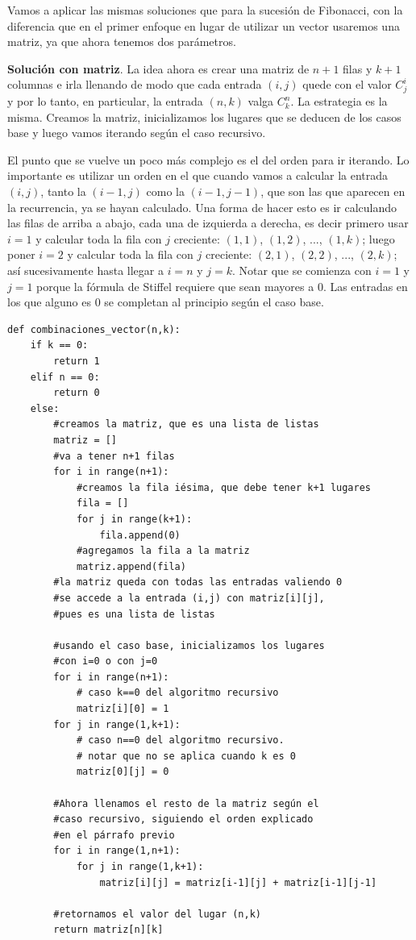 \documentclass[a4paper, 12pt]{report}
\theoremstyle{definition}
\begin{document}
Vamos a aplicar las mismas soluciones que para la sucesión de Fibonacci, con la diferencia que en el primer enfoque en lugar de utilizar un vector usaremos una matriz, ya que ahora tenemos dos parámetros.

{\bf Solución con matriz}. La idea ahora es crear una matriz de $n+1$ filas y $k+1$ columnas e irla llenando de modo que cada entrada $(i,j)$ quede con el valor $C^i_j$ y por lo tanto, en particular, la entrada $(n,k)$ valga $C^n_k$. La estrategia es la misma. Creamos la matriz, inicializamos los lugares que se deducen de los casos base y luego vamos iterando según el caso recursivo.

El punto que se vuelve un poco más complejo es el del orden para ir iterando. Lo importante es utilizar un orden en el que cuando vamos a calcular la entrada $(i,j)$, tanto la $(i-1,j)$ como la $(i-1,j-1)$, que son las que aparecen en la recurrencia, ya se hayan calculado. Una forma de hacer esto es ir calculando las filas de arriba a abajo, cada una de izquierda a derecha, es decir primero usar $i=1$ y calcular toda la fila con $j$ creciente: $(1,1)$, $(1,2)$, ..., $(1,k)$; luego poner $i=2$ y calcular toda la fila con $j$ creciente: $(2,1)$, $(2,2)$, ..., $(2,k)$; así sucesivamente hasta llegar a $i=n$ y $j=k$. Notar que se comienza con $i=1$ y $j=1$ porque la fórmula de Stiffel requiere que sean mayores a $0$. Las entradas en los que alguno es $0$ se completan al principio según el caso base.
\begin{verbatim}
def combinaciones_vector(n,k):
    if k == 0:
        return 1
    elif n == 0:
        return 0
    else:
        #creamos la matriz, que es una lista de listas
        matriz = []
        #va a tener n+1 filas
        for i in range(n+1):
            #creamos la fila iésima, que debe tener k+1 lugares
            fila = []
            for j in range(k+1):
                fila.append(0)
            #agregamos la fila a la matriz
            matriz.append(fila)
        #la matriz queda con todas las entradas valiendo 0
        #se accede a la entrada (i,j) con matriz[i][j],
        #pues es una lista de listas
        
        #usando el caso base, inicializamos los lugares
        #con i=0 o con j=0
        for i in range(n+1):
            # caso k==0 del algoritmo recursivo
            matriz[i][0] = 1
        for j in range(1,k+1):
            # caso n==0 del algoritmo recursivo.
            # notar que no se aplica cuando k es 0
            matriz[0][j] = 0
        
        #Ahora llenamos el resto de la matriz según el
        #caso recursivo, siguiendo el orden explicado
        #en el párrafo previo
        for i in range(1,n+1):
            for j in range(1,k+1):
                matriz[i][j] = matriz[i-1][j] + matriz[i-1][j-1]
        
        #retornamos el valor del lugar (n,k)
        return matriz[n][k]
\end{verbatim}
\end{document}
